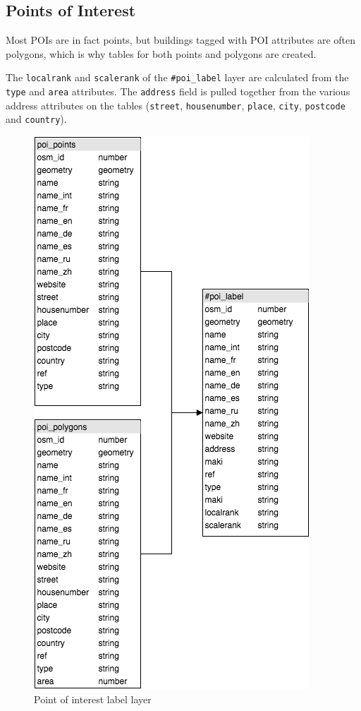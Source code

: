 \newpage
\subsection{Points of Interest}
Most POIs are in fact points, but buildings tagged with POI attributes
are often polygons, which is why tables for both points and polygons are created.

The \texttt{localrank} and \texttt{scalerank} of the \texttt{\#poi\_label} layer are calculated from the \texttt{type} and \texttt{area} attributes.
The \texttt{address} field is pulled together from the various address attributes on the tables (\texttt{street}, \texttt{housenumber}, \texttt{place}, \texttt{city}, \texttt{postcode} and \texttt{country}).

\begin{figure}[H]
\centering
  \includegraphics[scale=0.6]{images/poi_layer.png}
  \caption{Point of interest label layer}
\end{figure}

